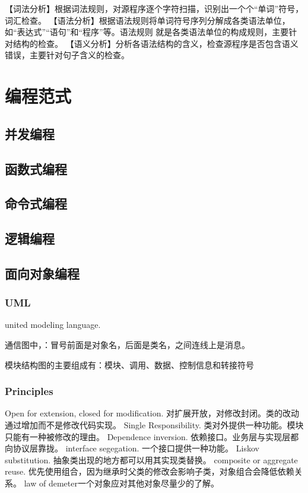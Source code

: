 \documentclass[UTF8]{../computerUniverse}
\begin{document}
【词法分析】根据词法规则，对源程序逐个字符扫描，识别出一个个“单词”符号，词汇检查。
【语法分析】根据语法规则将单词符号序列分解成各类语法单位，如“表达式”“语句”和“程序”等。语法规则
就是各类语法单位的构成规则，主要针对结构的检查。
【语义分析】分析各语法结构的含义，检查源程序是否包含语义错误，主要针对句子含义的检查。



\chapter{编程范式}

\section{并发编程}
\section{函数式编程}
\section{命令式编程}
\section{逻辑编程}

\section{面向对象编程}
    
\subsection{UML}
united modeling language. 

通信图中，：冒号前面是对象名，后面是类名，之间连线上是消息。

模块结构图的主要组成有：模块、调用、数据、控制信息和转接符号

\subsection{Principles}
Open for extension, closed for modification. 对扩展开放，对修改封闭。类的改动通过增加而不是修改代码实现。
Single Responsibility. 类对外提供一种功能。模块只能有一种被修改的理由。
Dependence inversion. 依赖接口。业务层与实现层都向协议层靠拢。
interface segegation. 一个接口提供一种功能。
Liskov substitution. 抽象类出现的地方都可以用其实现类替换。
composite or aggregate reuse. 优先使用组合，因为继承时父类的修改会影响子类，对象组合会降低依赖关系。
law of demeter一个对象应对其他对象尽量少的了解。
\end{document}
